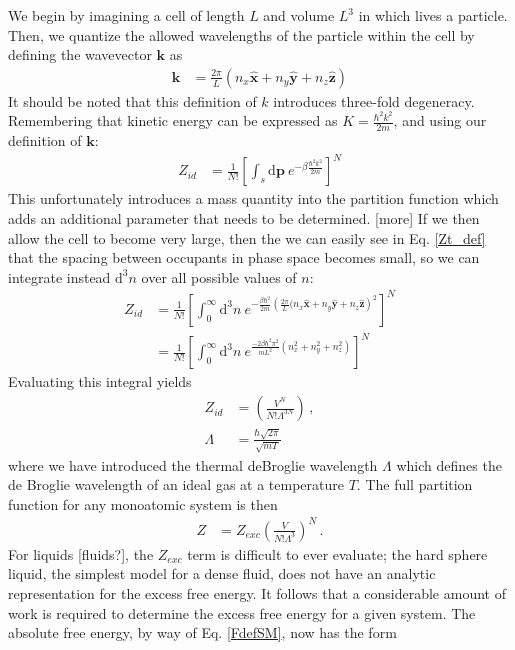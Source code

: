 \documentclass[12pt]{article}
\newcommand*{\diff}{\mathrm{d}}
\begin{document}
We begin by imagining a cell of length $L$ and volume $L^3$ in which lives a particle. Then, we quantize the allowed wavelengths of the particle within the cell by defining the wavevector $\mathbf{k}$ as
\begin{align}
    \mathbf{k} &= \frac{2\pi}{L}(n_x\mathbf{\hat{x}} + n_y\mathbf{\hat{y}} + n_z\mathbf{\hat{z}})
\end{align}
It should be noted that this definition of $k$ introduces three-fold degeneracy.\\
Remembering that kinetic energy can be expressed as $K = \frac{\hbar^2 k^2}{2m}$, and using our definition of $\mathbf{k}$:
\begin{align}
    Z_{id} &= \frac{1}{N!}\left[\int_s \diff\mathbf{p} ~e^{-\beta \frac{\hbar^2 k^2}{2m}}\right]^{N}
    \label{Zt_def}
\end{align}
This unfortunately introduces a mass quantity into the partition function which adds an additional parameter that needs to be determined. [more] 
If we then allow the cell to become very large, then the we can easily see in Eq. \ref{Zt_def} that the spacing between occupants in phase space becomes small, so we can integrate instead $\diff ^3 n$ over all possible values of $n$:
\begin{align}
    Z_{id} &= \frac{1}{N!}\left[\int_0^\infty \diff^3 n ~e^{-\frac{\beta \hbar^2}{2m} \left(\frac{2\pi}{L}(n_x\mathbf{\hat{x}} + n_y\mathbf{\hat{y}} + n_z\mathbf{\hat{z}}\right)^2}\right]^{N} \\
    &= \frac{1}{N!}\left[\int_0^\infty \diff^3 n ~e^{ \frac{-2\beta \hbar^2\pi^2}{mL^2}(n_x^2 + n_y^2 + n_z^2)}\right]^{N}
\end{align}
Evaluating this integral yields
\begin{align}
    Z_{id} &= \left(\frac{V^N}{N!\Lambda^{3N}}\right) \,, \\
    \Lambda &= \frac{\hbar\sqrt{2\pi}}{\sqrt{mT}}
\end{align}
where we have introduced the thermal deBroglie wavelength $\Lambda$ which defines the de Broglie wavelength of an ideal gas at a temperature $T$. The full partition function for any monoatomic system is then
\begin{align}
    Z &= Z_{exc} \left(\frac{V}{N!\Lambda^{3}}\right)^{N} \,.
\end{align}
For liquids [fluids?], the $Z_{exc}$ term is difficult to ever evaluate; the hard sphere liquid, the simplest model for a dense fluid, does not have an analytic representation for the excess free energy. It follows that a considerable amount of work is required to determine the excess free energy for a given system. The absolute free energy, by way of Eq. \ref{FdefSM}, now has the form
\end{document}
